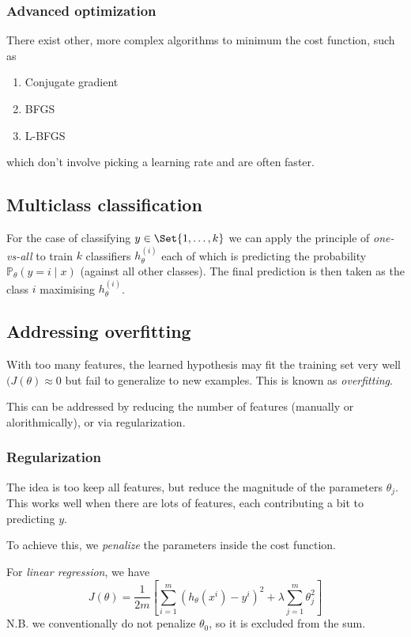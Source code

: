 \documentclass[a4paper,12pt]{article}
\theoremstyle{definition}
\renewcommand{\Pr}{\mathbb{P}}
\providecommand\given{} %
\renewcommand{\given}{\mid}
\begin{document}
\subsubsection{Advanced optimization}
There exist other, more complex algorithms to minimum the cost function, such as
\begin{enumerate}
\item Conjugate gradient
\item BFGS
\item L-BFGS
\end{enumerate}
which don't involve picking a learning rate and are often faster.

\subsection{Multiclass classification}
For the case of classifying $y \in \Set{1, \ldots, k}$ we can apply the principle of \emph{one-vs-all} to train $k$ classifiers $h_{\theta}^{(i)}$ each of which is predicting the probability $\Pr_{\theta}(y = i \given x)$ (against all other classes). The final prediction is then taken as the class $i$ maximising $h_{\theta}^{(i)}$.

\subsection{Addressing overfitting}
With too many features, the learned hypothesis may fit the training set very well $(J(\theta) \approx 0$ but fail to generalize to new examples. This is known as \emph{overfitting}.

This can be addressed by reducing the number of features (manually or alorithmically), or via regularization. 

\subsubsection{Regularization}
The idea is too keep all features, but reduce the magnitude of the parameters $\theta_j$. This works well when there are lots of features, each contributing a bit to predicting $y$.

To achieve this, we \emph{penalize} the parameters inside the cost function.

For \emph{linear regression}, we have
\[
J(\theta) = \frac{1}{2m} \left[ \sum_{i=1}^{m}{ \left( h_{\theta}(x^{i}) - y^{i}\right)^{2} } + \lambda \sum_{j=1}^{m} \theta_j^2 \right]
\]
N.B. we conventionally do not penalize $\theta_0$, so it is excluded from the sum.
\end{document}
